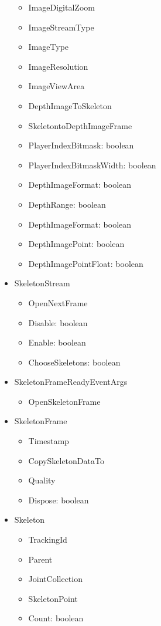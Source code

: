 \documentclass[11pt,a4paper]{article}
\begin{document}
\begin{itemize}
\begin{itemize}
	\item ImageDigitalZoom
	\item ImageStreamType
	\item ImageType
	\item ImageResolution
	\item ImageViewArea
	\item DepthImageToSkeleton
	\item SkeletontoDepthImageFrame
	\item PlayerIndexBitmask: boolean
	\item PlayerIndexBitmaskWidth: boolean
	\item DepthImageFormat: boolean
	\item DepthRange: boolean
	\item DepthImageFormat: boolean
	\item DepthImagePoint: boolean
	\item DepthImagePointFloat: boolean
	\end{itemize}	 
\item SkeletonStream
	\begin{itemize}
	\item OpenNextFrame
	\item Disable: boolean
	\item Enable: boolean
	\item ChooseSkeletons: boolean
	\end{itemize} 
\item SkeletonFrameReadyEventArgs
	\begin{itemize}
	\item OpenSkeletonFrame
	\end{itemize}	
\item SkeletonFrame
	\begin{itemize}
	\item Timestamp
	\item CopySkeletonDataTo
	\item Quality
	\item Dispose: boolean
	\end{itemize}	
\item Skeleton
	\begin{itemize}
	\item TrackingId
	\item Parent
	\item JointCollection
	\item SkeletonPoint
	\item Count: boolean

\end{itemize}
\end{itemize}
\end{document}
